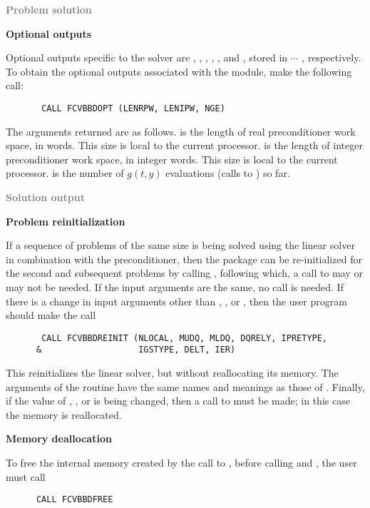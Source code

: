 \begin{Steps}
\item \textcolor{gray}{\bf Problem solution}
  
\item {\bf {\cvbbdpre} Optional outputs}
  
  Optional outputs specific to the {\spgmr} solver are , , , 
  , , and , stored in  $\cdots$ , 
  respectively.
  To obtain the optional outputs associated with the {\cvbbdpre} module, make
  the following call:
\begin{verbatim}
       CALL FCVBBDOPT (LENRPW, LENIPW, NGE)
\end{verbatim}
  The arguments returned are as follows.
   is the length of real preconditioner work space, in  words.
  This size is local to the current processor.
   is the length of integer preconditioner work space, in integer words.
  This size is local to the current processor.
   is the number of $g(t,y)$ evaluations (calls to ) so far.
  
\item \textcolor{gray}{\bf Solution output}
  
\item {\bf Problem reinitialization}
  
  If a sequence of problems of the same size is being solved using the {\spgmr}
  linear solver in combination with the {\cvbbdpre} preconditioner, then the
  {\cvode} package can be re-initialized for the second and subsequent problems
  by calling , following which, a call to  may or 
  may not be needed.
  If the input arguments are the same, no  call is needed.
  If there is a change in input arguments other than , , or , 
  then the user program should make the call 
\begin{verbatim}
       CALL FCVBBDREINIT (NLOCAL, MUDQ, MLDQ, DQRELY, IPRETYPE, 
      &                   IGSTYPE, DELT, IER)
\end{verbatim}
  This reinitializes the {\spgmr} linear solver, but without reallocating its memory.  
  The arguments of the  routine have the same names and meanings as 
  those of .
  Finally, if the value of , , or  is being changed, then a call to 
   must be made; in this case the {\spgmr} memory is reallocated.
  
\item {\bf Memory deallocation}

  To free the internal memory created by the call to , before calling
   and , the user must call
\begin{verbatim}
      CALL FCVBBDFREE
\end{verbatim}

\end{Steps}
